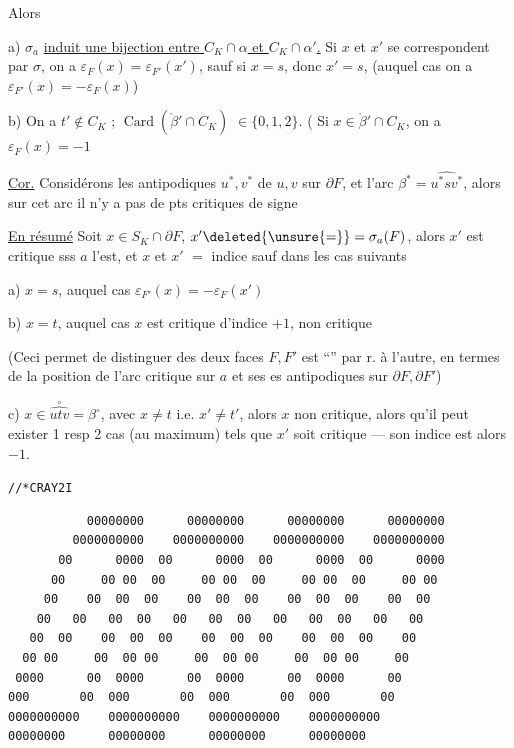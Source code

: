 Alors

a)  $\sigma_a$ \uline{induit une bijection entre $C_K\cap\alpha$ et $C_K\cap\alpha'$.}  Si $x$ et $x'$ se correspondent par $\sigma$, on a $\varepsilon_F(x)=\varepsilon_{F'}(x')$, sauf si $x=s$, donc $x'=s$, (auquel cas on a $\varepsilon_{F'}(x)=-\varepsilon_F(x)$)

b) On a $t'\notin C_K$ ;   $\operatorname{Card}(\mathring{\beta}'\cap C_K)$  $\in\{0,1,2\}$. (   Si $x\in\mathring{\beta}'\cap C_K$, on a $\varepsilon_F(x)=-1$

\uline{Cor.} Considérons les antipodiques $u^*,v^*$ de $u,v$ sur $\partial F$, et l'arc $\beta^*=\widehat{u^*sv^*}$,  alors sur cet arc il n'y a pas de pts critiques de signe 

\uline{En résumé} \quad Soit $x\in S_K\cap\partial F$,  $x'\deleted{\unsure{=}}=\sigma_a(F)$, alors $x'$ est critique sss $a$ l'est, et $x$ et $x'$  $=$ indice sauf dans les cas suivants

a) $x=s$, auquel cas $\varepsilon_{F'}(x)=-\varepsilon_F(x')$

b) $x=t$, auquel cas  $x$ est critique d'indice $+1$,  non critique

(Ceci permet de distinguer   des deux faces $F,F'$ est ``'' par r. à l'autre, en termes de la position de l'arc critique  sur $a$ et ses es antipodiques sur $\partial F,\partial F'$)

c) $x\in\overset{\circ}{\widehat{utv}}=\beta^\circ$, avec $x\ne t$ i.e. $x'\ne t'$, alors $x$ non critique, alors qu'il peut exister 1 resp 2 cas (au maximum) tels que $x'$ soit critique --- son indice est alors $-1$.


\texttt{//*\quad CRAY2\qquad I}

{\scriptsize
\begin{verbatim}
           00000000      00000000      00000000      00000000
         0000000000    0000000000    0000000000    0000000000
       00      0000  00      0000  00      0000  00      0000
      00     00 00  00     00 00  00     00 00  00     00 00
     00    00  00  00    00  00  00    00  00  00    00  00
    00   00   00  00   00   00  00   00   00  00   00   00
   00  00    00  00  00    00  00  00    00  00  00    00
  00 00     00  00 00     00  00 00     00  00 00     00
 0000      00  0000      00  0000      00  0000      00
000       00  000       00  000       00  000       00
0000000000    0000000000    0000000000    0000000000
00000000      00000000      00000000      00000000
\end{verbatim}
}

